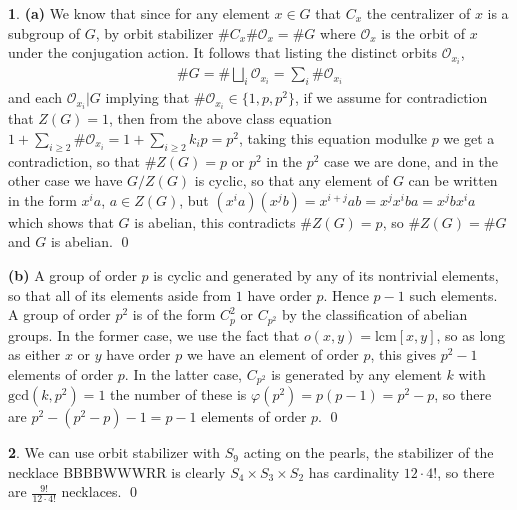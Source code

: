 \documentclass[10.5pt]{article}
\theoremstyle{definition}
\newtheorem{pb}{}
\newcommand{\set}[1]{\{#1\}}
\begin{document}
    \begin{pb}
        \textbf{(a)} We know that since for any element \(x \in G\) that \(C_x\) the centralizer of \(x\) is a subgroup of \(G\), by orbit stabilizer \(\#C_x\#\mathcal{O}_x = \#G\) where \(\mathcal{O}_x\) is the orbit of \(x\) under the conjugation action. It follows that listing the distinct orbits \(\mathcal{O}_{x_i}\),
        \begin{align*}
            \#G = \#\bigsqcup_i \mathcal{O}_{x_i} = \sum_i \#\mathcal{O}_{x_i}
        \end{align*}
        and each \(\mathcal{O}_{x_i} \vert G\) implying that \(\#\mathcal{O}_{x_i} \in \set{1,p,p^2}\), if we assume for contradiction that \(Z(G) = 1\), then from the above class equation \(1 + \sum_{i \geq 2} \#\mathcal{O}_{x_i} = 1 + \sum_{i \geq 2}k_i p = p^2\), taking this equation modulke \(p\) we get a contradiction, so that \(\#Z(G) = p\) or \(p^2\) in the \(p^2\) case we are done, and in the other case we have \(G/Z(G)\) is cyclic, so that any element of \(G\) can be written in the form \(x^ia\), \(a \in Z(G)\), but \((x^ia)(x^jb) = x^{i+j}ab = x^jx^iba = x^jbx^ia\) which shows that \(G\) is abelian, this contradicts \(\#Z(G) = p\), so \(\#Z(G) = \#G\) and \(G\) is abelian. \qed

        \textbf{(b)} A group of order \(p\) is cyclic and generated by any of its nontrivial elements, so that all of its elements aside from \(1\) have order \(p\). Hence \(p-1\) such elements. A group of order \(p^2\) is of the form \(C_p^2\) or \(C_{p^2}\) by the classification of abelian groups. In the former case, we use the fact that \(o(x,y) = \text{lcm}[x,y]\), so as long as either \(x\) or \(y\) have order \(p\) we have an element of order \(p\), this gives \(p^2 - 1\) elements of order \(p\). In the latter case, \(C_{p^2}\) is generated by any element \(k\) with \(\text{gcd}(k,p^2) = 1\) the number of these is \(\varphi(p^2) = p(p-1) = p^2 - p\), so there are \(p^2 - (p^2 - p) - 1 = p-1\) elements of order \(p\). \qed
    \end{pb}
    \begin{pb}
        We can use orbit stabilizer with \(S_9\) acting on the pearls, the stabilizer of the necklace BBBBWWWRR is clearly \(S_4 \times S_3 \times S_2\) has cardinality \(12\cdot4!\), so there are \(\frac{9!}{12\cdot4!}\) necklaces. \qed
    \end{pb}
\end{document}
